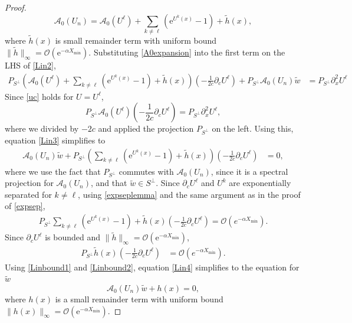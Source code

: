 \documentclass[review,onefignum,onetabnum]{siamart171218}
\newcommand{\rme}{\mathrm{e}}
\newcommand{\calA}{\mathcal{A}}
\begin{document}
\begin{proof}
\begin{equation}\label{A0expansion}
\calA_0(U_n) = \calA_0(U^\ell) + \sum_{k \neq \ell} (\rme^{U^k(x)} - 1) + \tilde{h}(x),
\end{equation}
where $\tilde{h}(x)$ is small remainder term with uniform bound $\|\tilde{h}\|_\infty = \mathcal{O}(\rme^{-\alpha X_{\mathrm{min}}})$. Substituting \cref{A0expansion} into the first term on the LHS of \cref{Lin2},
\begin{align}\label{Lin3}
P_{S^\perp} \left( \calA_0(U^\ell) + \sum_{k \neq \ell} (\rme^{U^k(x)} - 1) + \tilde{h}(x) \right) \left(-\frac{1}{2c}\partial_cU^\ell \right) + P_{S^\perp} \calA_0(U_n) \tilde{w} &= P_{S^\perp}\partial_x^2U^\ell
\end{align}
Since \cref{uc} holds for $U = U^\ell$, 
\begin{equation}
P_{S^\perp} \calA_0(U^\ell) \left( -\frac{1}{2c} \partial_c U^\ell \right) = P_{S^\perp}\partial_x^2 U^\ell,
\end{equation}
where we divided by $-2c$ and applied the projection $P_{S^\perp}$ on the left. Using this, equation \cref{Lin3} simplifies to
\begin{align}\label{Lin4}
\calA_0(U_n) \tilde{w} + 
P_{S^\perp} \left( \sum_{k \neq \ell} (\rme^{U^k(x)} - 1) + \tilde{h}(x) \right) \left(-\frac{1}{2c}\partial_cU^\ell \right) &= 0,
\end{align}
where we use the fact that $P_{S^\perp}$ commutes with $\calA_0(U_n)$, since it is a spectral projection for $\calA_0(U_n)$, and that $\tilde{w} \in S^\perp$. Since $\partial_c U^\ell$ and $U^k$ are exponentially separated for $k \neq \ell$, using \cref{expseplemma} and the same argument as in the proof of \cref{expsep},
\begin{align}\label{Linbound1}
P_{S^\perp} \sum_{k \neq \ell} (\rme^{U^k(x)} - 1) + \tilde{h}(x) \left(-\frac{1}{2c}\partial_cU^\ell \right) = \mathcal{O}\left(e^{-\alpha X_{\min}}\right).
\end{align}
Since $\partial_c U^\ell$ is bounded and  $\|\tilde{h}\|_\infty = \mathcal{O}(\rme^{-\alpha X_{\mathrm{min}}})$, 
\begin{align}\label{Linbound2}
P_{S^\perp} \tilde{h}(x) \left(-\frac{1}{2c}\partial_cU^\ell \right) &=  \mathcal{O}\left(e^{-\alpha X_{\min}}\right).
\end{align}
Using \cref{Linbound1} and \cref{Linbound2}, equation \cref{Lin4} simplifies to the equation for $\tilde{w}$
\begin{equation}\label{A0heq}
\calA_0(U_n) \tilde{w} + h(x) = 0,
\end{equation}
where $h(x)$ is a small remainder term with uniform bound $\|h(x)\|_\infty = \mathcal{O}(\rme^{-\alpha X_{\mathrm{min}}})$. 


\end{proof}
\end{document}
